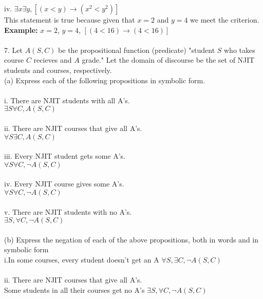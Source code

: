 \documentclass[10pt]{article}
\begin{document}
iv. $\exists x \exists y, [(x < y) \rightarrow (x^2 < y^2)]$\\
This statement is true because given that $x = 2$ and $y = 4$ we meet the criterion.\\
\textbf{Example:} $x = 2$, $y = 4$,  $[(4 < 16) \rightarrow (4 < 16)]$\\~\\



7. Let $A(S,C)$ be the propositional function (predicate) "student $S$ who takes course $C$ recieves and $A$ grade."  Let the domain of discourse be the set of NJIT students and courses, respectively.\\

(a)  Express each of the following propositions in symbolic form.\\~\\

i.  There are NJIT students with all A's.\\
$\exists S \forall C, A(S,C)$\\~\\

ii.  There are NJIT courses that give all A's.\\
$\forall S \exists C, A(S,C)$\\~\\

iii.  Every NJIT student gets some A's.\\
$\forall S \forall C, \neg A(S,C)$\\~\\

iv. Every NJIT course gives some A's.\\
$\forall S \forall C, \neg A(S,C)$\\~\\

v.  There are NJIT students with no A's.\\
$\exists S, \forall C, \neg A(S,C)$\\~\\

(b)  Express the negation of each of the above propositions, both in words and in symbolic form\\

i.In some courses, every student doesn't get an A
$\forall S, \exists C, \neg A(S,C)$\\~\\

ii.  There are NJIT courses that give all A's.\\
Some students in all their courses get no A's
$\exists S, \forall C, \neg A(S,C)$\\~\\
\end{document}
